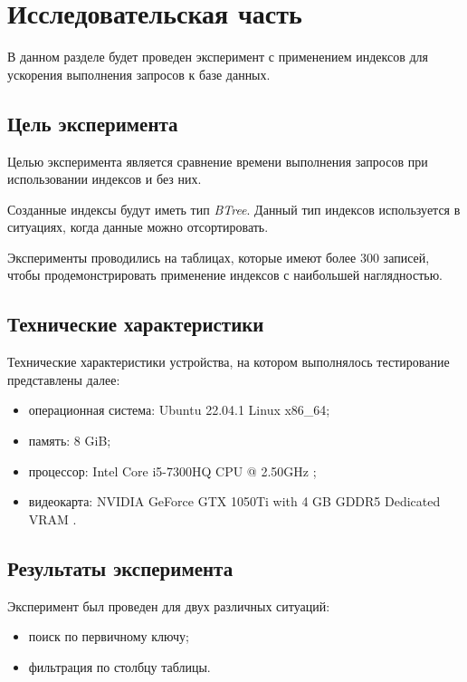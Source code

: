 \chapter{Исследовательская часть}

В данном разделе будет проведен эксперимент с применением индексов для ускорения выполнения запросов к базе данных.


\section{Цель эксперимента}

Целью эксперимента является сравнение времени выполнения запросов при использовании индексов и без них. 

Созданные индексы будут иметь тип \textit{BTree}. Данный тип индексов используется в ситуациях, когда данные можно отсортировать.

Эксперименты проводились на таблицах, которые имеют более 300 записей, чтобы продемонстрировать применение индексов с наибольшей наглядностью.


\section{Технические характеристики}

Технические характеристики устройства, на котором выполнялось тестирование представлены далее:

\begin{itemize}
    \item операционная система: Ubuntu 22.04.1 \cite{ubuntu} Linux \cite{linux} x86\_64;
    \item память: 8 GiB;
    \item процессор: Intel Core i5-7300HQ CPU @ 2.50GHz \cite{intel};
    \item видеокарта: NVIDIA GeForce GTX 1050Ti with 4 GB GDDR5 Dedicated VRAM \cite{gtx1050}.
\end{itemize}


\section{Результаты эксперимента}

Эксперимент был проведен для двух различных ситуаций: 

\begin{itemize}
    \item поиск по первичному ключу;
    \item фильтрация по столбцу таблицы.
\end{itemize}


